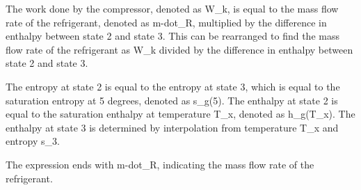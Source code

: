 The work done by the compressor, denoted as W_k, is equal to the mass flow rate of the refrigerant, denoted as m-dot_R, multiplied by the difference in enthalpy between state 2 and state 3. This can be rearranged to find the mass flow rate of the refrigerant as W_k divided by the difference in enthalpy between state 2 and state 3.

The entropy at state 2 is equal to the entropy at state 3, which is equal to the saturation entropy at 5 degrees, denoted as s_g(5). The enthalpy at state 2 is equal to the saturation enthalpy at temperature T_x, denoted as h_g(T_x). The enthalpy at state 3 is determined by interpolation from temperature T_x and entropy s_3.

The expression ends with m-dot_R, indicating the mass flow rate of the refrigerant.
